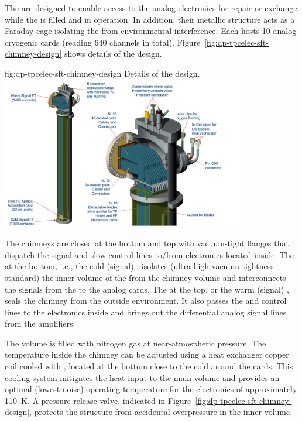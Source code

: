 The  are designed to enable access to the  analog electronics for repair or exchange while the  is filled and in operation. In addition, their metallic structure acts as a Faraday cage isolating the   from environmental interference.  Each  hosts \num{10} analog cryogenic  cards (reading \num{640} channels in total). Figure~\ref{fig:dp-tpcelec-sft-chimney-design} shows details of the design. 

\begin{dunefigure}{fig:dp-tpcelec-sft-chimney-design}
{Details of the  design.}
\includegraphics[width=0.8\textwidth]{graphics/dp-tpcelec-sft-chimney-design}
\end{dunefigure}

The chimneys are closed at the bottom and top with vacuum-tight \fdth flanges that dispatch the signal and slow control lines to/from  electronics located inside. The \fdth at the bottom, i.e., the cold (signal) \fdth, isolates (ultra-high vacuum tightness standard) the inner volume of the  from the chimney volume and interconnects the signals from the  to the analog  cards. The \fdth at the top, or the warm (signal) \fdth, seals the chimney from the outside environment. It also passes the  and control lines to the  electronics inside and brings out the differential analog signal lines from the  amplifiers. 

The  volume is filled with nitrogen gas at near-atmospheric pressure. The temperature inside the chimney can be adjusted using a heat exchanger copper coil cooled with , located at the bottom close to the cold \fdth around the  cards. This cooling system mitigates the heat input to the main  volume and provides an optimal (lowest noise) operating temperature for the  electronics of approximately \SI{110}{K}. A pressure release valve, indicated in Figure~\ref{fig:dp-tpcelec-sft-chimney-design}, protects the structure from accidental overpressure in the inner volume. 

